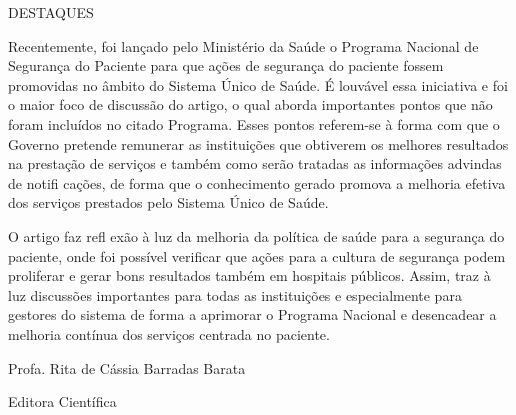 \documentclass{article}
\begin{document}

DESTAQUES

Recentemente, foi lançado pelo Ministério da Saúde o Programa Nacional de Segurança do
        Paciente para que ações de segurança do paciente fossem promovidas no âmbito do Sistema
        Único de Saúde. É louvável essa iniciativa e foi o maior foco de discussão do artigo, o qual
        aborda importantes pontos que não foram incluídos no citado Programa. Esses pontos
        referem-se à forma com que o Governo pretende remunerar as instituições que obtiverem os
        melhores resultados na prestação de serviços e também como serão tratadas as informações
        advindas de notifi cações, de forma que o conhecimento gerado promova a melhoria efetiva dos
        serviços prestados pelo Sistema Único de Saúde.

O artigo faz refl exão à luz da melhoria da política de saúde para a segurança do paciente,
        onde foi possível verificar que ações para a cultura de segurança podem proliferar e gerar
        bons resultados também em hospitais públicos. Assim, traz à luz discussões importantes para
        todas as instituições e especialmente para gestores do sistema de forma a aprimorar o
        Programa Nacional e desencadear a melhoria contínua dos serviços centrada no paciente.

Profa. Rita de Cássia Barradas Barata

Editora Científica
\end{document}
